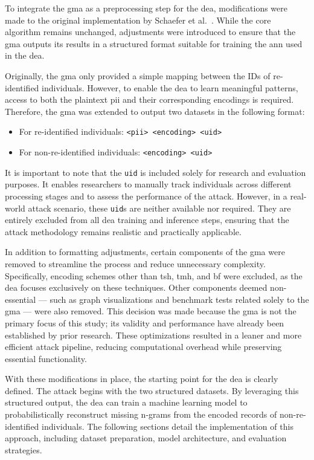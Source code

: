 To integrate the \ac{gma} as a preprocessing step for the \ac{dea}, modifications were made to the original implementation by Schaefer et al.~\cite{schaefer2024}.
While the core algorithm remains unchanged, adjustments were introduced to ensure that the \ac{gma} outputs its results in a structured format suitable for training the \ac{ann} used in the \ac{dea}.

Originally, the \ac{gma} only provided a simple mapping between the IDs of re-identified individuals.
However, to enable the \ac{dea} to learn meaningful patterns, access to both the plaintext \ac{pii} and their corresponding encodings is required.
Therefore, the \ac{gma} was extended to output two datasets in the following format:

\begin{itemize}
    \item For re-identified individuals: \texttt{<\ac{pii}> <encoding> <uid>}
    \item For non-re-identified individuals: \texttt{<encoding> <uid>}
\end{itemize}

It is important to note that the \texttt{uid} is included solely for research and evaluation purposes.
It enables researchers to manually track individuals across different processing stages and to assess the performance of the attack.
However, in a real-world attack scenario, these \texttt{uid}s are neither available nor required.
They are entirely excluded from all \ac{dea} training and inference steps, ensuring that the attack methodology remains realistic and practically applicable.

In addition to formatting adjustments, certain components of the \ac{gma} were removed to streamline the process and reduce unnecessary complexity.
Specifically, encoding schemes other than \ac{tsh}, \ac{tmh}, and \ac{bf} were excluded, as the \ac{dea} focuses exclusively on these techniques.
Other components deemed non-essential — such as graph visualizations and benchmark tests related solely to the \ac{gma} — were also removed.
This decision was made because the \ac{gma} is not the primary focus of this study; its validity and performance have already been established by prior research.
These optimizations resulted in a leaner and more efficient attack pipeline, reducing computational overhead while preserving essential functionality.

With these modifications in place, the starting point for the \ac{dea} is clearly defined.
The attack begins with the two structured datasets.
By leveraging this structured output, the \ac{dea} can train a machine learning model to probabilistically reconstruct missing n-grams from the encoded records of non-re-identified individuals.
The following sections detail the implementation of this approach, including dataset preparation, model architecture, and evaluation strategies.

